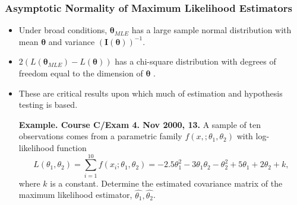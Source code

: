 \documentclass{beamer}
\begin{document}
\begin{frame}[shrink=2]
\frametitle{Asymptotic Normality of Maximum Likelihood Estimators}
\begin{itemize}
\item Under broad conditions, $\boldsymbol \theta_{MLE}$ has a large sample normal distribution with mean $\boldsymbol \theta$ and variance $\left( \mathbf{I}(\boldsymbol \theta) \right)^{-1}$.
\item  $2 \left( L(\boldsymbol \theta_{MLE}) - L(\boldsymbol \theta) \right)$  has a chi-square distribution with degrees of freedom equal to the dimension of $\boldsymbol \theta$ .
\item These are critical results upon which much of estimation and hypothesis testing is based.
\bigskip

\noindent\textbf{Example. Course C/Exam 4. Nov 2000, 13.} A sample of ten observations comes from a parametric family $f(x,; \theta_1, \theta_2)$ with log-likelihood function
\begin{equation*}
L(\theta_1, \theta_2)= \sum_{i=1}^{10} f(x_i; \theta_1, \theta_2) = -2.5 \theta_1^2 - 3
\theta_1 \theta_2 - \theta_2^2 + 5 \theta_1 + 2 \theta_2 + k,
\end{equation*}
where $k$ is a constant. Determine the estimated covariance matrix of the maximum likelihood estimator, $\hat{\theta_1}, \hat{\theta_2} $.
\end{itemize}
\end{frame}
\end{document}
